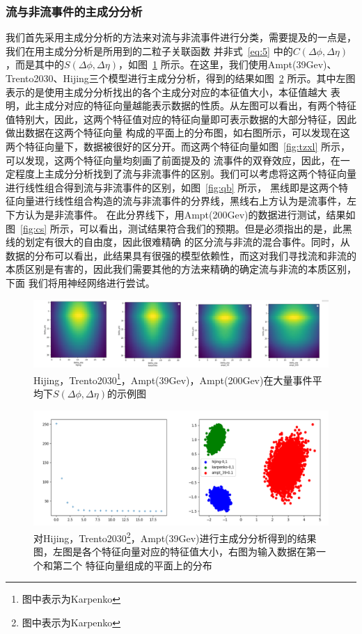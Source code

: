 \documentclass[aps,pre,12pt,preprint,onecolumn,showpacs,showkeys]{revtex4-1}
\begin{document}
\subsubsection{流与非流事件的主成分分析}
我们首先采用主成分分析的方法来对流与非流事件进行分类，需要提及的一点是，我们在用主成分分析是所用到的二粒子关联函数
并非式~\ref{eq:5} 中的$C(\Delta\phi,\Delta\eta)$，而是其中的$S(\Delta\phi,\Delta\eta)$，如图~\ref{fig:pcasample} 所示。在这里，我们使用Ampt(39Gev)、
Trento2030、Hijing三个模型进行主成分分析，得到的结果如图~\ref{fig:pcaresults} 所示。其中左图表示的是使用主成分分析找出的各个主成分对应的本征值大小，本征值越大
表明，此主成分对应的特征向量越能表示数据的性质。从左图可以看出，有两个特征值特别大，因此，这两个特征值对应的特征向量即可表示数据的大部分特征，因此做出数据在这两个特征向量
构成的平面上的分布图，如右图所示，可以发现在这两个特征向量下，数据被很好的区分开。而这两个特征向量如图~\ref{fig:tzxl} 所示，可以发现，这两个特征向量均刻画了前面提及的
流事件的双脊效应，因此，在一定程度上主成分分析找到了流与非流事件的区别。我们可以考虑将这两个特征向量进行线性组合得到流与非流事件的区别，如图~\ref{fig:qb} 所示，
黑线即是这两个特征向量进行线性组合构造的流与非流事件的分界线，黑线右上方认为是流事件，左下方认为是非流事件。
在此分界线下，用Ampt(200Gev)的数据进行测试，结果如图~\ref{fig:cs} 所示，可以看出，测试结果符合我们的预期。但是必须指出的是，此黑线的划定有很大的自由度，因此很难精确
的区分流与非流的混合事件。同时，从数据的分布可以看出，此结果具有很强的模型依赖性，而这对我们寻找流和非流的本质区别是有害的，因此我们需要其他的方法来精确的确定流与非流的本质区别，下面
我们将用神经网络进行尝试。
\begin{figure}[t]
\centering
\includegraphics[width=140mm]{pcasample}
\caption{\label{fig:pcasample}%
Hijing，Trento2030\footnote{图中表示为Karpenko}，Ampt(39Gev)，Ampt(200Gev)在大量事件平均下$S(\Delta\phi,\Delta\eta)$的示例图}
\end{figure}
\begin{figure}[t]
\centering
\includegraphics[width=140mm]{pcaresults}
\caption{\label{fig:pcaresults}%
对Hijing，Trento2030\footnote{图中表示为Karpenko}，Ampt(39Gev)进行主成分分析得到的结果图，左图是各个特征向量对应的特征值大小，右图为输入数据在第一个和第二个
特征向量组成的平面上的分布}
\end{figure}
\end{document}
